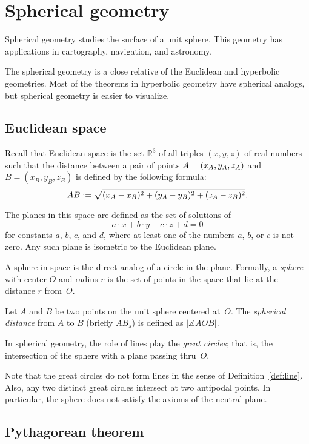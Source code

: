 \chapter{Spherical geometry}
\label{chap:sphere}

Spherical geometry studies the surface of a unit sphere.
This geometry has applications in cartography, navigation, and astronomy.

The spherical geometry is a close relative of the Euclidean and hyperbolic geometries.
Most of the theorems in hyperbolic geometry have spherical analogs,
but spherical geometry is easier to visualize. 

\section{Euclidean space}

Recall that Euclidean space is the set $\mathbb{R}^3$ of all triples $(x,y,z)$ of real numbers
such that the distance between a pair of points
$A=(x_A,y_A,z_A)$ and $B=(x_B,y_B,z_B)$
is defined by the following formula:
$$AB
:=
\sqrt{(x_A-x_B)^2+(y_A-y_B)^2+(z_A-z_B)^2}.$$

The planes in this space are defined as the set of solutions of 
$$a\cdot x+b\cdot y+c\cdot z+d=0$$ 
for constants $a$, $b$, $c$, and $d$, where at least one of the numbers $a$, $b$, or $c$ is not zero.
Any such plane is isometric to the Euclidean plane.

A sphere in space is the direct analog of a circle in the plane.
Formally, a \emph{sphere} with center $O$ and radius $r$ is the set of points in the space that lie at the distance $r$ from~$O$.

Let $A$ and $B$ be two points on the unit sphere centered at~$O$.
The \emph{spherical distance} from $A$ to $B$
(briefly $AB_s$)
 is defined as  $|\measuredangle AOB|$. 

In spherical geometry, the role of lines play the \emph{great circles};
that is, the intersection of the sphere with a plane passing thru~$O$.

Note that the great circles do not form lines in the sense of Definition~\ref{def:line}.
Also, any two distinct great circles intersect at two antipodal points.
In particular, the sphere does not satisfy the axioms of the neutral plane.

\section{Pythagorean theorem}

